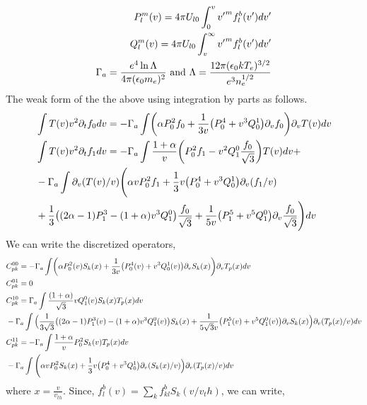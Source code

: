\documentclass{article}[draft]
\begin{document}
\begin{align*}
	P^{m}_l\of{v} = 4\pi U_{l0} \int_{0}^{v} {v^\prime}^m f^b_l(v^\prime) dv^\prime\\
	Q^{m}_l\of{v} = 4\pi U_{l0} \int_{v}^{\infty} {v^\prime}^m f^b_l(v^\prime) dv^\prime \\
	\Gamma_a    = \frac{e^4 \ln \Lambda}{4\pi (\epsilon_0 m_e)^2} \text{ and } \Lambda = \frac{12 \pi (\epsilon_0 k T_e)^{3/2}}{e^3 n_e^{1/2}}
\end{align*}
The weak form of the the above using integration by parts as follows.  
\begin{align*}
	&\int T(v) v^2 \partial_t f_0 dv = - \Gamma_a \int \of{\alpha P^2_0 f_0 + \frac{1}{3v}\of{P^4_0 + v^3 Q^1_0} \partial_v f_0} \partial_v T(v) dv\\
	&\int T(v) v^2 \partial_t f_1 dv = - \Gamma_a \int \frac{1+\alpha}{v} \of{P^2_0 f_1 -v^2 Q^0_1 \frac{f_0}{\sqrt{3}}} T(v) dv + \\
	&-\Gamma_a \int \partial_v \of{T(v)/v} \Bigg(\alpha v P^2_0 f_1 + \frac{1}{3} v\of{P^4_0 + v^3 Q^1_0} \partial_v \of{f_1/v}\\
	&+ \frac{1}{3}\of{(2\alpha -1 ) P^3_1 - (1 + \alpha) v^3 Q^0_1} \frac{f_0}{\sqrt{3}} + \frac{1}{5v}\of{P^5_1 + v^5 Q^0_1} \partial_v \frac{f_0}{\sqrt{3}} \Bigg) dv
\end{align*} We can write the discretized operators, 
\begin{align*}
	&C^{00}_{pk} = - \Gamma_a \int \of{\alpha P^2_0\of{v} S_k\of{x} + \frac{1}{3v}\of{P^4_0\of{v} + v^3 Q^1_0\of{v}} \partial_v S_k\of{x}} \partial_v T_p\of{x}  dv\\
	&C^{01}_{pk} = 0\\
	&C^{10}_{pk} = \Gamma_a \int \frac{(1+\alpha)}{\sqrt{3}} v Q^0_1\of{v} S_k\of{x} T_p\of{x} dv\\
	&-\Gamma_a \int \Big(\frac{1}{3\sqrt{3}}\of{(2\alpha -1 ) P^3_1\of{v} - (1 + \alpha) v^3 Q^0_1\of{v}}S_k\of{x} + \frac{1}{5\sqrt{3}v}\of{P^5_1\of{v} + v^5 Q^0_1\of{v}}\partial_v S_k\of{x} \Big) \partial_v \of{T_p\of{x}/v} dv \\
	&C^{11}_{pk} = -\Gamma_a \int  \frac{1+\alpha}{v} P^2_0 S_k\of{v} T_p\of{x} dv \\
	&-\Gamma_a \int \Bigg(\alpha v P^2_0 S_k\of{x} + \frac{1}{3} v\of{P^4_0 + v^3 Q^1_0} \partial_v \of{S_k\of{x}/v}\Big) \partial_v\of{T_p\of{x}/v} dv
\end{align*} where $x=\frac{v}{v_{th}}$. Since, $f^b_l(v) = \sum_k f^b_{kl} S_k (v/v_th)$, we can write, 
\end{document}
